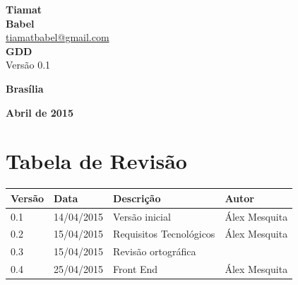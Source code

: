 \documentclass[11pt]{article} %
\begin{document}
\begin{titlepage}
 \vfill
  \begin{center}
   {\large \textbf{Tiamat}} \\
   {\large \textbf{Babel}}\\
   {\large \href{mailto:tiamatbabel@gmail.com}{tiamatbabel@gmail.com}}\\[6cm]


   {\Large \textbf{GDD}}\\
   {\Large Versão 0.1}\\[6cm]

   \hspace{.45\textwidth} %
  \vfill

\vspace{2cm}

\large \textbf{Brasília}

\large \textbf{Abril de 2015}
\end{center}
\end{titlepage}
\newpage

\tableofcontents

\newpage


\section{Tabela de Revisão}


\begin{table}[h]
\begin{tabular}{|l|l|p{60mm}|l|}

\hline
\textbf{Versão}     & \textbf{Data}     & \textbf{Descrição}                                & \textbf{Autor}    \\ \hline
0.1                 & 14/04/2015        & Versão inicial                                    & Álex Mesquita     \\ \hline
0.2                 & 15/04/2015        & Requisitos Tecnológicos                           & Álex Mesquita     \\ \hline
0.3                 & 15/04/2015        & Revisão ortográfica                               &                   \\ \hline
0.4                 & 25/04/2015        & Front End                                         & Álex Mesquita     \\ \hline
\end{tabular}
\end{table}
\end{document}
